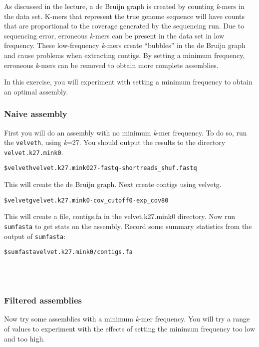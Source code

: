 \documentclass[11pt,a4paper]{scrartcl}
\newcommand{\oneline}{
~\\
~\\
\noindent
}
\begin{document}
As discussed in the lecture, a de Bruijn graph is created by counting \emph{k}-mers in
the data set. K-mers that represent the true genome sequence will have counts
that are proportional to the coverage generated by the sequencing run. Due to
sequencing error, erroneous \emph{k}-mers can be present in the data set in low
frequency. These low-frequency \emph{k}-mers create “bubbles” in the de Bruijn graph
and cause problems when extracting contigs. By setting a minimum frequency,
erroneous \emph{k}-mers can be removed to obtain more complete assemblies. 


In this exercise, you will experiment with setting a minimum frequency to
obtain an optimal assembly.

\subsubsection{Naive assembly}

First you will do an assembly with no minimum \emph{k}-mer frequency. To do so, run
the \texttt{velveth}, using \emph{k}=27. You should output the results to the directory
\texttt{velvet.k27.mink0}. 
\begin{alltt}
    \$ velveth velvet.k27.mink0 27 -fastq -short reads_shuf.fastq
\end{alltt}
\noindent
This will create the de Bruijn graph. Next create contigs using velvetg.
\begin{alltt}
    \$ velvetg velvet.k27.mink0 -cov_cutoff 0 -exp_cov 80
\end{alltt}
\noindent
This will create a file, contigs.fa in the velvet.k27.mink0 directory. Now run
\texttt{sumfasta} to get stats on the assembly. Record some summary statistics
from the output of \texttt{sumfasta}:
\begin{alltt}
    \$ sumfasta velvet.k27.mink0/contigs.fa
\end{alltt}
\oneline
\subsubsection{Filtered assemblies}
Now try some assemblies with a minimum \emph{k}-mer frequency. You will try a range of
values to experiment with the effects of setting the minimum frequency too low
and too high. 
\end{document}
